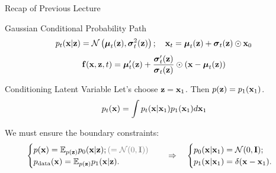 \documentclass{beamer}
\begin{document}
\begin{frame}{Recap of Previous Lecture}
	\begin{block}{Gaussian Conditional Probability Path}
		\vspace{-0.3cm}
		\[
			p_t(\mathbf{x} | \mathbf{z}) = \mathcal{N}\left(\boldsymbol{\mu}_t(\mathbf{z}), \boldsymbol{\sigma}_t^2(\mathbf{z})\right); \quad \mathbf{x}_t = \boldsymbol{\mu}_t(\mathbf{z}) + \boldsymbol{\sigma}_t(\mathbf{z}) \odot \mathbf{x}_0
		\]
		\vspace{-0.3cm}
		\[
			\mathbf{f}(\mathbf{x}, \mathbf{z}, t) =  \boldsymbol{\mu}_t'(\mathbf{z}) + \frac{\boldsymbol{\sigma}_t'(\mathbf{z})}{\boldsymbol{\sigma}_t(\mathbf{z})} \odot (\mathbf{x} - \boldsymbol{\mu}_t(\mathbf{z}))
		\]
		\vspace{-0.3cm}
	\end{block}
	\begin{block}{Conditioning Latent Variable}
		Let’s choose $\mathbf{z} = \mathbf{x}_1$. Then $p(\mathbf{z}) = p_1(\mathbf{x}_1)$.
		\[
			p_t(\mathbf{x}) = \int p_t(\mathbf{x} | \mathbf{x}_1) p_1(\mathbf{x}_1) d \mathbf{x}_1
		\]
		\vspace{-0.5cm}
	\end{block}
	We must ensure the boundary constraints:
	\[
		\begin{cases}
			p(\bx) = \bbE_{p(\bz)} p_0(\bx | \bz); {\color{gray}(= \cN(0, \bI))} \\
			\pd(\bx) = \bbE_{p(\bz)} p_1(\bx | \bz).
		\end{cases}
		\quad \Rightarrow \quad 
		\begin{cases}
			p_0(\bx | \bx_1) = \cN(0, \bI); \\
			p_1(\bx | \bx_1) = \delta(\bx - \bx_1).
		\end{cases}
	\]
	\vspace{-0.3cm}
\end{frame}
\end{document}
